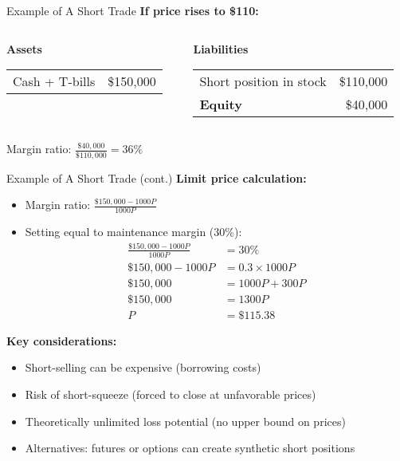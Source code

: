 \documentclass[10pt,handout]{beamer}
\begin{document}
\begin{frame}{Example of A Short Trade}
  \textbf{If price rises to \$110:}
  \begin{columns}
    \begin{column}{0.48\textwidth}
      \textbf{Assets} \vspace{0.2em}\\
      \begin{tabular}{lr}
        Cash + T-bills & \$150,000 \\
      \end{tabular}
    \end{column}
    \begin{column}{0.48\textwidth}
      \textbf{Liabilities} \vspace{0.2em}\\
      \begin{tabular}{lr}
        Short position in stock & \$110,000 \\[0.5em]
        \textbf{Equity} & \$40,000 \\
      \end{tabular}
    \end{column}
  \end{columns}
  
  Margin ratio: $\tfrac{\$40,000}{\$110,000} = 36\%$
\end{frame}

\begin{frame}{Example of A Short Trade (cont.)}
  \textbf{Limit price calculation:}
  \begin{itemize}
    \item Margin ratio: $\tfrac{\$150,000 - 1000P}{1000P}$
    \item Setting equal to maintenance margin (30\%):
    \begin{align*}
      \tfrac{\$150,000 - 1000P}{1000P} &= 30\%\\
      \$150,000 - 1000P &= 0.3 \times 1000P\\
      \$150,000 &= 1000P + 300P\\
      \$150,000 &= 1300P\\
      P &= \$115.38
    \end{align*}
  \end{itemize}
  
  \pause
  \textbf{Key considerations:}
  \begin{itemize}
    \item Short-selling can be expensive (borrowing costs)
    \item Risk of short-squeeze (forced to close at unfavorable prices)
    \item Theoretically unlimited loss potential (no upper bound on prices)
    \item Alternatives: futures or options can create synthetic short positions
  \end{itemize}
\end{frame}
\end{document}
